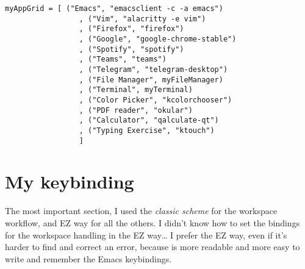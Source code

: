 \documentclass[11pt]{article}
\begin{document}
\begin{verbatim}
myAppGrid = [ ("Emacs", "emacsclient -c -a emacs")
                 , ("Vim", "alacritty -e vim")
                 , ("Firefox", "firefox")
                 , ("Google", "google-chrome-stable")
                 , ("Spotify", "spotify")
                 , ("Teams", "teams")
                 , ("Telegram", "telegram-desktop")
                 , ("File Manager", myFileManager)
                 , ("Terminal", myTerminal)
                 , ("Color Picker", "kcolorchooser")
                 , ("PDF reader", "okular")
                 , ("Calculator", "qalculate-qt")
                 , ("Typing Exercise", "ktouch")
                 ]
\end{verbatim}
\section{My keybinding}
\label{sec:org187722c}
The most important section, I used the \emph{classic scheme} for the workspace workflow, and EZ way for all the others.
I didn't know how to set the bindings for the workspace handling in the EZ way\ldots{}
I prefer the EZ way, even if it's harder to find and correct an error, because is more readable and more easy to write and remember the Emacs keybindings.
\end{document}
